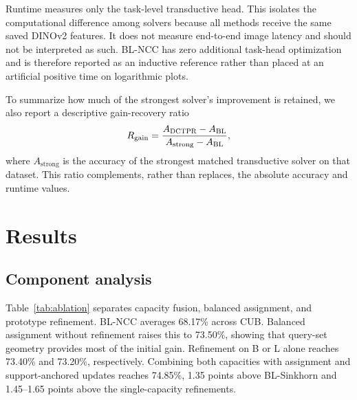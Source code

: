 \documentclass[10pt,twocolumn]{article}
\newcommand{\method}{\textsc{DCTPR}\xspace}
\begin{document}
Runtime measures only the task-level transductive head. This isolates the
computational difference among solvers because all methods receive the same
saved DINOv2 features. It does not measure end-to-end image latency and should
not be interpreted as such. BL-NCC has zero additional task-head optimization
and is therefore reported as an inductive reference rather than placed at an
artificial positive time on logarithmic plots.

To summarize how much of the strongest solver's improvement is retained, we
also report a descriptive gain-recovery ratio
\begin{equation}
 R_{\mathrm{gain}}=
 \frac{A_{\method}-A_{\mathrm{BL}}}
 {A_{\mathrm{strong}}-A_{\mathrm{BL}}},
 \label{eq:recovery}
\end{equation}
where $A_{\mathrm{strong}}$ is the accuracy of the strongest matched
transductive solver on that dataset. This ratio complements, rather than
replaces, the absolute accuracy and runtime values.

\section{Results}
\label{sec:results}

\subsection{Component analysis}
\label{sec:ablation}

Table~\ref{tab:ablation} separates capacity fusion, balanced assignment, and
prototype refinement. BL-NCC averages 68.17\% across CUB. Balanced assignment
without refinement raises this to 73.50\%, showing that query-set geometry
provides most of the initial gain. Refinement on B or L alone reaches 73.40\%
and 73.20\%, respectively. Combining both capacities with assignment and
support-anchored updates reaches 74.85\%, 1.35 points above BL-Sinkhorn and
1.45--1.65 points above the single-capacity refinements.

\begin{table}[t]
\centering
\caption{CUB component analysis. Values are balanced accuracy (\%) averaged
over ten rotations. E1 is development; E2--E3 are frozen confirmation.}
\label{tab:ablation}
\end{table}
\end{document}
